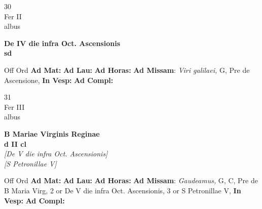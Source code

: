 \documentclass[10pt, openany]{book}
\begin{document}
        \begin{center}
            \begin{minipage}{3.5in}
                \vspace{2em}
                \begin{minipage}{0.5in}
                    {\Huge 30} \\
                    {\normalsize Fer II} \\
                    {\normalsize albus}
                \end{minipage}
                \begin{minipage}{3.0in}
                    \textbf{ \large De IV die infra Oct. Ascensionis \\
                    \textnormal{\normalsize sd}} \\ 
                \end{minipage}
                \begin{justify}Off Ord
                    \textbf{Ad Mat: }
                    \textbf{Ad Lau: }
                    \textbf{Ad Horas: }\textbf{Ad Missam}: \textit{Viri galilaei,} G, Pre de Ascensione,  
                    \textbf{In Vesp: }
                    \textbf{Ad Compl: }
                \end{justify}
            \end{minipage}
        \end{center}
    
        \begin{center}
            \begin{minipage}{3.5in}
                \vspace{2em}
                \begin{minipage}{0.5in}
                    {\Huge 31} \\
                    {\normalsize Fer III} \\
                    {\normalsize albus}
                \end{minipage}
                \begin{minipage}{3.0in}
                    \textbf{ \large B Mariae Virginis Reginae \\
                    \textnormal{\normalsize d II cl}} \\ \textit{[De V die infra Oct. Ascensionis]} \\ \textit{[S Petronillae V]} \\ 
                \end{minipage}
                \begin{justify}Off Ord
                    \textbf{Ad Mat: }
                    \textbf{Ad Lau: }
                    \textbf{Ad Horas: }\textbf{Ad Missam}: \textit{Gaudeamus,} G, C, Pre de B Maria Virg, 2 or De V die infra Oct. Ascensionis, 3 or S Petronillae V,  
                    \textbf{In Vesp: }
                    \textbf{Ad Compl: }
                \end{justify}
            \end{minipage}
        \end{center}
    
\end{document}
